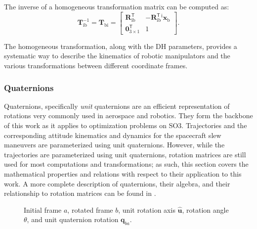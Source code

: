 The inverse of a homogeneous transformation matrix can be computed as:
\begin{equation}
    \mathbf{T}_{\text{ib}}^{-1} =
    \mathbf{T}_{\text{bi}} =
    \begin{bmatrix}
        \mathbf{R}_{\text{ib}}^\mathsf{T} & -\mathbf{R}_{\text{ib}}^\mathsf{T} {}^{\text{i}}\mathbf{x}_{\text{b}} \\
        \mathbf{0}^\mathsf{T}_{3 \times 1} & 1
    \end{bmatrix}.
\end{equation}

The homogeneous transformation, along with the \ac{DH} parameters, provides a systematic way to describe the kinematics of robotic manipulators and the various transformations between different coordinate frames.

\subsubsection{Quaternions}
\label{par:quaternions}
Quaternions, specifically \emph{unit} quaternions are an efficient representation of rotations very commonly used in aerospace and robotics.
They form the backbone of this work as it applies to optimization problems on \ac{SO3}. 
Trajectories and the corresponding attitude kinematics and dynamics for the spacecraft slew maneuvers are parameterized using unit quaternions.
However, while the trajectories are parameterized using unit quaternions, rotation matrices are still used for most computations and transformations; as such, this section covers the mathematical properties and relations with respect to their application to this work. 
A more complete description of quaternions, their algebra, and their relationship to rotation matrices can be found in \cite{Diebel06}.

\begin{figure}[htbp]
    \centering
    
    \caption{Initial frame $a$, rotated frame $b$, unit rotation axis $\hat{\mathbf{u}}$, rotation angle $\theta$, and unit quaternion rotation $\mathbf{q}_{ba}$.}
    \label{fig:quaternion-rotation}
\end{figure}

